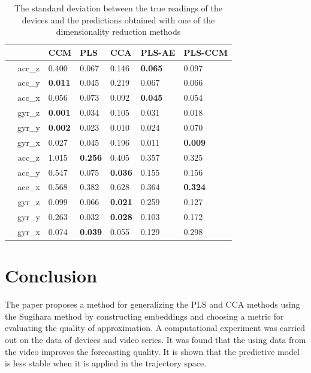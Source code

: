 \documentclass[bst/sn-mathphys]{sn-jnl}%
\theoremstyle{thmstyleone}%
\theoremstyle{thmstyletwo}%
\theoremstyle{thmstylethree}%
\begin{document}
\begin{table}[bhtp]
	\centering
	\caption{The standard deviation between the true readings of the devices and the predictions obtained with one of the dimensionality reduction methods}
	\label{tbl:methods}
	\begin{tabular}{l|c|lllll}
		\hline
		\multicolumn{2}{l}{\diaghead{\hskip4cm}{Target feature}{Method}} \vline & CCM & PLS & CCA & PLS-AE & PLS-CCM \\
		\hline
		\multirow{6}{*}{\rotatebox[origin=c]{90}{cyclic}} & acc\_z & 0.400 & 0.067 & 0.146 & \textbf{0.065} & 0.097 \\
		& acc\_y & \textbf{0.011} & 0.045 & 0.219 & 0.067 & 0.066 \\
		& acc\_x & {0.056} & 0.073 & 0.092 & \textbf{0.045} & 0.054 \\
		& gyr\_z & \textbf{0.001} & 0.034 & 0.105 & 0.031 & 0.018 \\
		& gyr\_y & \textbf{0.002} & 0.023 & 0.010 & 0.024 & 0.070 \\
		& gyr\_x & {0.027} & 0.045 & 0.196 & 0.011 & \textbf{0.009} \\
		\hline
		\multirow{6}{*}{\rotatebox[origin=c]{90}{chaotic}} & acc\_z & 1.015 & \textbf{0.256} & 0.405 & 0.357 & 0.325 \\
		& acc\_y & 0.547 & 0.075 & \textbf{0.036} & 0.155 & 0.156 \\
		& acc\_x & {0.568} & 0.382 & 0.628 & 0.364 & \textbf{0.324} \\
		& gyr\_z & {0.099} & 0.066 & \textbf{0.021} & 0.259 & 0.127 \\
		& gyr\_y & {0.263} & 0.032 & \textbf{0.028} & 0.103 & 0.172 \\
		& gyr\_x & {0.074} & \textbf{0.039} & 0.055 & 0.129 & 0.298 \\
		\hline   
	\end{tabular}
\end{table}

\section{Conclusion}
The paper proposes a method for generalizing the PLS and CCA methods using the Sugihara method by constructing embeddings and choosing a metric for evaluating the quality of approximation.
A computational experiment was carried out on the data of devices and video series.
It was found that the using data from the video improves the forecasting quality.
It is shown that the predictive model is less stable when it is applied in the trajectory space.
\end{document}
